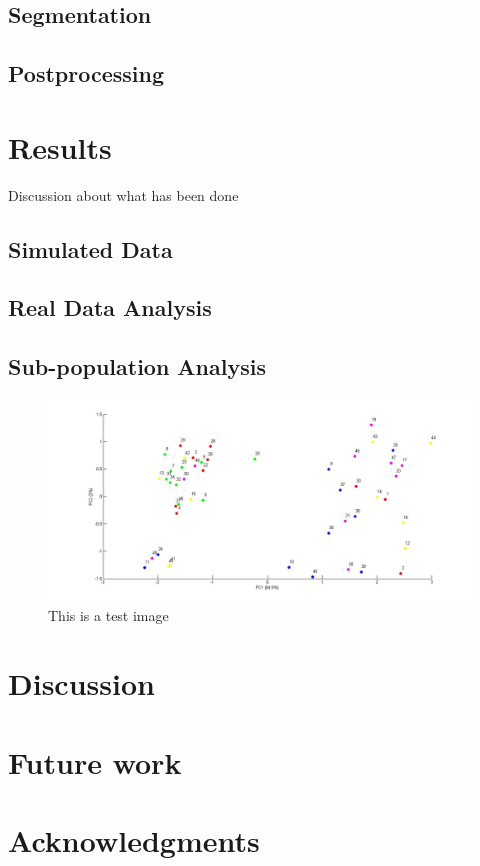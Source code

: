 \documentclass[twocolumn,oneside,conference]
{IEEEtran}
\begin{document}
\subsection{Segmentation}
\subsection{Postprocessing}

\section{Results}
Discussion about what has been done
\subsection{Simulated Data}
\subsection{Real Data Analysis}
\subsection{Sub-population Analysis}
\begin{figure}[h]
	\includegraphics[width=\textwidth]{final.jpg}
	\caption{This is a test image}
	\label{fig1: this is test image}
\end{figure}

\section{Discussion}

\section{Future work}

\section*{Acknowledgments}


\printbibliography
\end{document}
